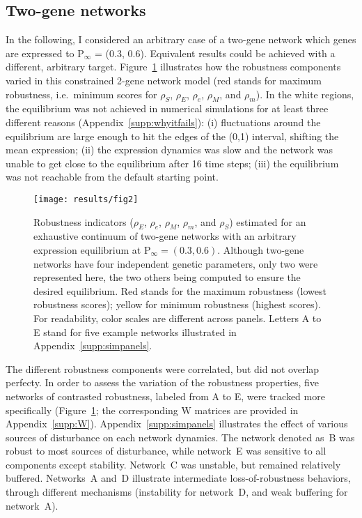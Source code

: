\documentclass[10pt,a4paper]{article}
\newcommand{\stability}{{\rho_S}}
\newcommand{\earlyenv}{{\rho_E}}
\newcommand{\lateenv}{{\rho_e}}
\newcommand{\earlymut}{{\rho_M}}
\newcommand{\latemut}{{\rho_m}}
\newcommand{\W}{\bm{\mathrm W}}
\newcommand{\Pp}{\bm{\mathrm P}}
\newcommand{\SupMat}{Appendix~}
\begin{document}
\subsection{Two-gene networks}

In the following, I considered an arbitrary case of a two-gene network which genes are expressed to $\Pp_\infty$ = (0.3, 0.6). Equivalent results could be achieved with a different, arbitrary target. Figure~\ref{fig:imgpanels} illustrates how the robustness components varied in this constrained 2-gene network model (red stands for maximum robustness, i.e.\ minimum scores for $\stability$, $\earlyenv$, $\lateenv$, $\earlymut$, and $\latemut$). In the white regions, the equilibrium was not achieved in numerical simulations for at least three different reasons (\SupMat \ref{supp:whyitfails}): (i) fluctuations around the equilibrium are large enough to hit the edges of the (0,1) interval, shifting the mean expression; (ii) the expression dynamics was slow and the network was unable to get close to the equilibrium after 16 time steps; (iii) the equilibrium was not reachable from the default starting point.

\begin{figure}[t]
\begin{adjustwidth}{-1in}{0in}
\begin{flushright}
\texttt{[image: results/fig2]}
\caption{\color{Gray} \label{fig:imgpanels} Robustness indicators ($\earlyenv$, $\lateenv$, $\earlymut$, $\latemut$, and $\stability$) estimated for an exhaustive continuum of two-gene networks with an arbitrary expression equilibrium at $\Pp_\infty = (0.3, 0.6)$. Although two-gene networks have four independent genetic parameters, only two were represented here, the two others being computed to ensure the desired equilibrium. Red stands for the maximum robustness (lowest robustness scores); yellow for minimum robustness (highest scores). For readability, color scales are different across panels. Letters A to E stand for five example networks illustrated in \SupMat \ref{supp:simpanels}.}
\end{flushright}\end{adjustwidth}
\end{figure}

The different robustness components were correlated, but did not overlap perfecty. In order to assess the variation of the robustness properties, five networks of contrasted robustness, labeled from A to E, were tracked more specifically (Figure~\ref{fig:imgpanels}; the corresponding $\W$ matrices are provided in \SupMat \ref{supp:W}). \SupMat \ref{supp:simpanels} illustrates the effect of various sources of disturbance on each network dynamics. The network denoted as~B was robust to most sources of disturbance, while network~E was sensitive to all components except stability. Network~C was unstable, but remained relatively buffered. Networks~A and~D illustrate intermediate loss-of-robustness behaviors, through different mechanisms (instability for network~D, and weak buffering for network~A). 
\end{document}
